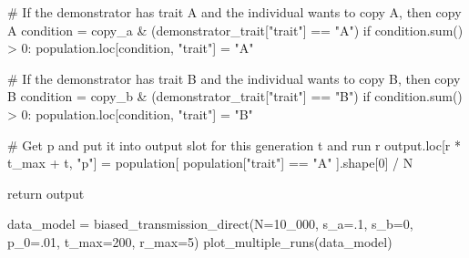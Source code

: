 \documentclass[
  a4paperpaper,
  ,captions=tableheading
]{scrbook}
\newenvironment{Shaded}{\begin{snugshade}}{\end{snugshade}}
\newcommand{\BuiltInTok}[1]{\textcolor[rgb]{0.00,0.23,0.31}{#1}}
\newcommand{\CommentTok}[1]{\textcolor[rgb]{0.37,0.37,0.37}{#1}}
\newcommand{\ControlFlowTok}[1]{\textcolor[rgb]{0.00,0.23,0.31}{#1}}
\newcommand{\DecValTok}[1]{\textcolor[rgb]{0.68,0.00,0.00}{#1}}
\newcommand{\FloatTok}[1]{\textcolor[rgb]{0.68,0.00,0.00}{#1}}
\newcommand{\NormalTok}[1]{\textcolor[rgb]{0.00,0.23,0.31}{#1}}
\newcommand{\OperatorTok}[1]{\textcolor[rgb]{0.37,0.37,0.37}{#1}}
\newcommand{\StringTok}[1]{\textcolor[rgb]{0.13,0.47,0.30}{#1}}
\begin{document}
\begin{Shaded}
\begin{Highlighting}[]
            \CommentTok{\# If the demonstrator has trait A and the individual wants to copy A, then copy A}
\NormalTok{            condition }\OperatorTok{=}\NormalTok{ copy\_a }\OperatorTok{\&}\NormalTok{ (demonstrator\_trait[}\StringTok{"trait"}\NormalTok{] }\OperatorTok{==} \StringTok{"A"}\NormalTok{)}
            \ControlFlowTok{if}\NormalTok{ condition.}\BuiltInTok{sum}\NormalTok{() }\OperatorTok{\textgreater{}} \DecValTok{0}\NormalTok{:}
\NormalTok{                population.loc[condition, }\StringTok{"trait"}\NormalTok{] }\OperatorTok{=} \StringTok{"A"}

            \CommentTok{\# If the demonstrator has trait B and the individual wants to copy B, then copy B}
\NormalTok{            condition }\OperatorTok{=}\NormalTok{ copy\_b }\OperatorTok{\&}\NormalTok{ (demonstrator\_trait[}\StringTok{"trait"}\NormalTok{] }\OperatorTok{==} \StringTok{"B"}\NormalTok{)}
            \ControlFlowTok{if}\NormalTok{ condition.}\BuiltInTok{sum}\NormalTok{() }\OperatorTok{\textgreater{}} \DecValTok{0}\NormalTok{:}
\NormalTok{                population.loc[condition, }\StringTok{"trait"}\NormalTok{] }\OperatorTok{=} \StringTok{"B"}

            \CommentTok{\# Get p and put it into output slot for this generation t and run r}
\NormalTok{            output.loc[r }\OperatorTok{*}\NormalTok{ t\_max }\OperatorTok{+}\NormalTok{ t, }\StringTok{"p"}\NormalTok{] }\OperatorTok{=}\NormalTok{ population[ population[}\StringTok{"trait"}\NormalTok{] }\OperatorTok{==} \StringTok{"A"}\NormalTok{ ].shape[}\DecValTok{0}\NormalTok{] }\OperatorTok{/}\NormalTok{ N}

    \ControlFlowTok{return}\NormalTok{ output }
\end{Highlighting}
\end{Shaded}

\begin{Shaded}
\begin{Highlighting}[]
\NormalTok{data\_model }\OperatorTok{=}\NormalTok{ biased\_transmission\_direct(N}\OperatorTok{=}\DecValTok{10\_000}\NormalTok{, s\_a}\OperatorTok{=}\FloatTok{.1}\NormalTok{, s\_b}\OperatorTok{=}\DecValTok{0}\NormalTok{, }
\NormalTok{                                         p\_0}\OperatorTok{=}\FloatTok{.01}\NormalTok{, t\_max}\OperatorTok{=}\DecValTok{200}\NormalTok{, r\_max}\OperatorTok{=}\DecValTok{5}\NormalTok{)}
\NormalTok{plot\_multiple\_runs(data\_model)}
\end{Highlighting}
\end{Shaded}
\end{document}
